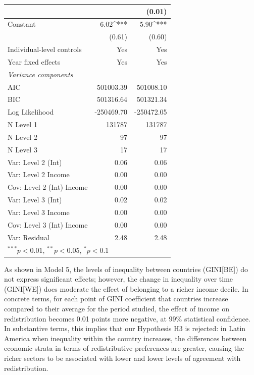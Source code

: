 \documentclass[utf8]{frontiersSCNS} %
\begin{document}
\begin{table}
\begin{tabular}{l D{.}{.}{7.5} D{.}{.}{7.5} }
                                    &             & (0.01)      \\
\hline
Constant                            & 6.02^{***}  & 5.90^{***}  \\
                                    & (0.61)      & (0.60)      \\
\hline
Individual-level controls           &     Yes     &     Yes     \\
Year fixed effects                  &     Yes     &     Yes     \\
\hline
\textit{Variance components}        &             &             \\
AIC                                 & 501003.39   & 501008.10   \\
BIC                                 & 501316.64   & 501321.34   \\
Log Likelihood                      & -250469.70  & -250472.05  \\
N Level 1                           & 131787      & 131787      \\
N Level 2                           & 97          & 97          \\
N Level 3                           & 17          & 17          \\
Var: Level 2 (Int)                  & 0.06        & 0.06        \\
Var: Level 2 Income                 & 0.00        & 0.00        \\
Cov: Level 2 (Int) Income           & -0.00       & -0.00       \\
Var: Level 3 (Int)                  & 0.02        & 0.02        \\
Var: Level 3 Income                 & 0.00        & 0.00        \\
Cov: Level 3 (Int) Income           & 0.00        & 0.00        \\
Var: Residual                       & 2.48        & 2.48        \\
\bottomrule
{}
\end{tabular}
\end{table}

As shown in Model 5, the levels of inequality between countries (GINI[BE]) do not express significant effects; however, the change in inequality over time (GINI[WE]) does moderate the effect of belonging to a richer income decile. In concrete terms, for each point of GINI coefficient that countries increase compared to their average for the period studied, the effect of income on redistribution becomes 0.01 points more negative, at 99\% statistical confidence. In substantive terms, this implies that our Hypothesis H3 is rejected: in Latin America when inequality within the country increases, the differences between economic strata in terms of redistributive preferences are greater, causing the richer sectors to be associated with lower and lower levels of agreement with redistribution.
\end{document}
